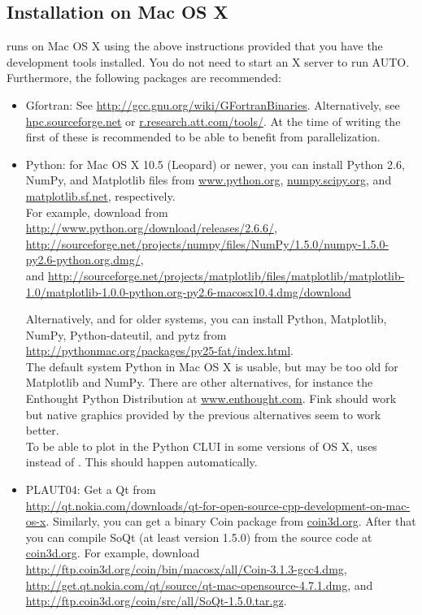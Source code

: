 \documentclass[12pt]{report}
\begin{document}
\subsection{Installation on Mac OS X}
\AUTO runs on Mac OS X using the above instructions provided that
you have the development tools
installed. You do not need to start an X server to run AUTO.
Furthermore, the following packages are recommended:
\begin{itemize}
\item Gfortran: See \url{http://gcc.gnu.org/wiki/GFortranBinaries}.
Alternatively, see \url{hpc.sourceforge.net} or \url{r.research.att.com/tools/}.
At the time of writing the first of these is recommended to be able
to benefit from parallelization.
\item Python: for Mac OS X 10.5 (Leopard) or newer, 
you can install Python 2.6, NumPy, and Matplotlib  files
from \url{www.python.org}, \url{numpy.scipy.org},
and \url{matplotlib.sf.net}, respectively.\\
For example, download from\\
\url{http://www.python.org/download/releases/2.6.6/},\\
\url{http://sourceforge.net/projects/numpy/files/NumPy/1.5.0/numpy-1.5.0-py2.6-python.org.dmg/},\\
and 
\url{http://sourceforge.net/projects/matplotlib/files/matplotlib/matplotlib-1.0/matplotlib-1.0.0-python.org-py2.6-macosx10.4.dmg/download}

Alternatively, and for older systems, you can install Python,
Matplotlib, NumPy, Python-dateutil, and pytz from 
\url{http://pythonmac.org/packages/py25-fat/index.html}.\\
The default system Python in Mac OS X is usable, but may be too old for
Matplotlib and NumPy.
There are other alternatives, for instance the Enthought Python
Distribution at \url{www.enthought.com}. Fink should work but native
graphics provided by the previous alternatives seem to work better.\\
To be able to plot in the Python CLUI in some versions of OS X,
\AUTO uses  instead of .
This should happen automatically.
\item {\cal PLAUT04}: Get a Qt  from\\
\url{http://qt.nokia.com/downloads/qt-for-open-source-cpp-development-on-mac-os-x}.
Similarly, you can get a binary Coin package from \url{coin3d.org}.
After that you can compile SoQt (at least version 1.5.0)
from the source code at \url{coin3d.org}.
For example, download
\url{http://ftp.coin3d.org/coin/bin/macosx/all/Coin-3.1.3-gcc4.dmg},
\url{http://get.qt.nokia.com/qt/source/qt-mac-opensource-4.7.1.dmg}, and
\url{http://ftp.coin3d.org/coin/src/all/SoQt-1.5.0.tar.gz}.


\end{itemize}
\end{document}
